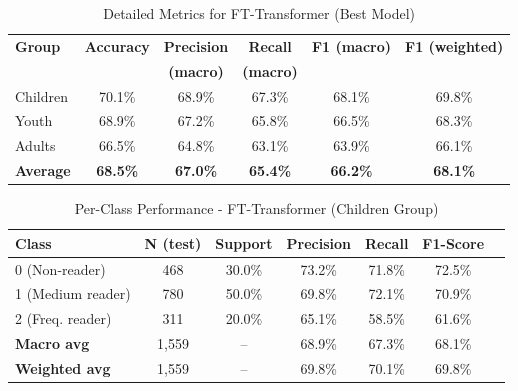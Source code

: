 \documentclass{article}
\begin{document}

\begin{table}[ht]
\centering
\caption{Detailed Metrics for FT-Transformer (Best Model)}
\label{tab:metrics_fttrans}
\begin{tabular}{lccccc}
\toprule
\textbf{Group} & \textbf{Accuracy} & \textbf{Precision} & \textbf{Recall} & \textbf{F1 (macro)} & \textbf{F1 (weighted)} \\
& & \textbf{(macro)} & \textbf{(macro)} & & \\
\midrule
Children & 70.1\% & 68.9\% & 67.3\% & 68.1\% & 69.8\% \\
Youth    & 68.9\% & 67.2\% & 65.8\% & 66.5\% & 68.3\% \\
Adults   & 66.5\% & 64.8\% & 63.1\% & 63.9\% & 66.1\% \\
\midrule
\textbf{Average} & \textbf{68.5\%} & \textbf{67.0\%} & \textbf{65.4\%} & \textbf{66.2\%} & \textbf{68.1\%} \\
\bottomrule
\end{tabular}
\end{table}


\begin{table}[ht]
\centering
\caption{Per-Class Performance - FT-Transformer (Children Group)}
\label{tab:perclass_children}
\begin{tabular}{lcccccc}
\toprule
\textbf{Class} & \textbf{N (test)} & \textbf{Support} & \textbf{Precision} & \textbf{Recall} & \textbf{F1-Score} \\
\midrule
0 (Non-reader)    & 468 & 30.0\% & 73.2\% & 71.8\% & 72.5\% \\
1 (Medium reader) & 780 & 50.0\% & 69.8\% & 72.1\% & 70.9\% \\
2 (Freq. reader)  & 311 & 20.0\% & 65.1\% & 58.5\% & 61.6\% \\
\midrule
\textbf{Macro avg}    & 1,559 & -- & 68.9\% & 67.3\% & 68.1\% \\
\textbf{Weighted avg} & 1,559 & -- & 69.8\% & 70.1\% & 69.8\% \\
\bottomrule
\end{tabular}
\end{table}
\end{document}
